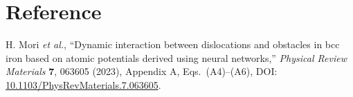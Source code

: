\documentclass[11pt,a4paper]{article}
\begin{document}
\section{Reference}

H. Mori \emph{et al.}, ``Dynamic interaction between dislocations and
obstacles in bcc iron based on atomic potentials derived using neural
networks,'' \emph{Physical Review Materials} \textbf{7}, 063605 (2023),
Appendix A, Eqs.~(A4)--(A6), DOI:
\href{https://doi.org/10.1103/PhysRevMaterials.7.063605}
{10.1103/PhysRevMaterials.7.063605}.
\end{document}
